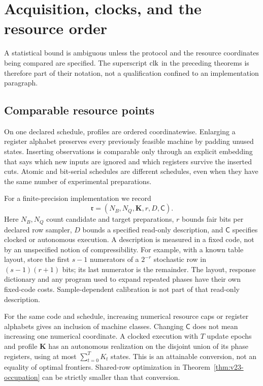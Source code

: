 \section{Acquisition, clocks, and the resource order}
\label{sec:v23-acquisition}
A statistical bound is ambiguous unless the protocol and the resource
coordinates being compared are specified. The superscript ${\rm clk}$
in the preceding theorems is therefore part of their notation, not a
qualification confined to an implementation paragraph.

\subsection{Comparable resource points}
On one declared schedule, profiles are ordered coordinatewise.
Enlarging a register alphabet preserves every previously feasible
machine by padding unused states. Inserting observations is comparable
only through an explicit embedding that says which new inputs are
ignored and which registers survive the inserted cuts. Atomic and
bit-serial schedules are different schedules, even when they have the
same number of experimental preparations.

For a finite-precision implementation we record
\begin{equation}\label{eq:v23-resource-tuple}
 \mathfrak r=(N_B,N_Q,\mathbf K,r,D,\mathsf C).
\end{equation}
Here $N_B,N_Q$ count candidate and target preparations, $r$ bounds
fair bits per declared row sampler, $D$ bounds a specified read-only
description, and $\mathsf C$ specifies clocked or autonomous execution.
A description is measured in a fixed code, not by an unspecified
notion of compressibility. For example, with a known table layout,
store the first $s-1$ numerators of a $2^{-r}$ stochastic row in
$(s-1)(r+1)$ bits; its last numerator is the remainder. The layout,
response dictionary and any program used to expand repeated phases
have their own fixed-code costs. Sample-dependent calibration is not
part of that read-only description.

For the same code and schedule, increasing numerical resource caps
or register alphabets gives an inclusion of machine classes. Changing
$\mathsf C$ does not mean increasing one numerical coordinate. A
clocked execution with $T$ update epochs and profile $\mathbf K$ has an
autonomous realization on the disjoint union of its phase registers,
using at most $\sum_{t=0}^T K_t$ states. This is an attainable conversion,
not an equality of optimal frontiers. Shared-row optimization in
Theorem~\ref{thm:v23-occupation} can be strictly smaller than that
conversion.

